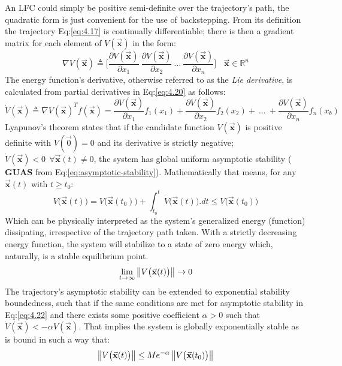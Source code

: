 An LFC could simply be positive semi-definite over the trajectory's path, the quadratic form is just convenient for the use of backstepping. From its definition the trajectory Eq:\ref{eq:4.17} is continually differentiable; there is then a gradient matrix for each element of $V(\vec{\mathbf{x}})$ in the form:
\begin{equation}\label{eq:4.20}
\nabla V(\vec{\mathbf{x}})\triangleq\bigg[\frac{\partial V(\vec{\mathbf{x}})}{\partial x_1}~\frac{\partial V(\vec{\mathbf{x}})}{\partial x_2}~\ldots~\frac{\partial V(\vec{\mathbf{x}})}{\partial x_n}\bigg]~~~~\vec{\mathbf{x}}\in\mathbb{R}^n
\end{equation}
The energy function's derivative, otherwise referred to as the \emph{Lie derivative}, is calculated from partial derivatives in Eq:\ref{eq:4.20} as follows:
\begin{equation}
\dot{V}(\vec{\mathbf{x}})\triangleq\nabla V(\vec{\mathbf{x}})^Tf(\vec{\mathbf{x}})=\frac{\partial V(\vec{\mathbf{x}})}{\partial x_1}f_1(x_1)+\frac{\partial V(\vec{\mathbf{x}})}{\partial x_2}f_2(x_2)+~\ldots~+\frac{\partial V(\vec{\mathbf{x}})}{\partial x_n}f_n(x_b)
\end{equation}
Lyapunov's theorem states that if the candidate function $V(\vec{\mathbf{x}})$ is positive definite with $V(\vec{0})=0$ and its derivative is strictly negative; $\dot{V}(\vec{\mathbf{x}})< 0~~\forall \vec{\mathbf{x}}(t) \not= 0$, the system has global uniform asymptotic stability ($\mathbf{GUAS}$ from Eq:\ref{eq:asymptotic-stability}). Mathematically that means, for any $\vec{\mathbf{x}}(t)$ with $t\geq t_0$:
\begin{equation}\label{eq:4.22}
V\big(\vec{\mathbf{x}}(t)\big)=V\big(\vec{\mathbf{x}}(t_0)\big)+\int_{t_0}^t \dot{V}\big(\vec{\mathbf{x}}(t)\big).dt \leq V\big(\vec{\mathbf{x}}(t_0)\big)
\end{equation}
Which can be physically interpreted as the system's generalized energy (function) dissipating, irrespective of the trajectory path taken. With a strictly decreasing energy function, the system will stabilize to a state of zero energy which, naturally, is a stable equilibrium point.
\begin{equation}
\lim_{t\rightarrow\infty}\left\lVert V\big(\vec{\mathbf{x}}(t)\big)\right\rVert\rightarrow 0
\end{equation}
The trajectory's asymptotic stability can be extended to exponential stability boundedness, such that if the same conditions are met for asymptotic stability in Eq:\ref{eq:4.22} and there exists some positive coefficient $\alpha>0$ such that $\dot{V}(\vec{\mathbf{x}})<-\alpha V(\vec{\mathbf{x}})$. That implies the system is globally exponentially stable as is bound in such a way that:
\begin{equation}\label{eq:lyapunov-exponential-stability}
\left\lVert V\big(\vec{\mathbf{x}}(t)\big)\right\rVert\leq Me^{-\alpha}\left\lVert V\big(\vec{\mathbf{x}}(t_0)\big)\right\rVert
\end{equation}
